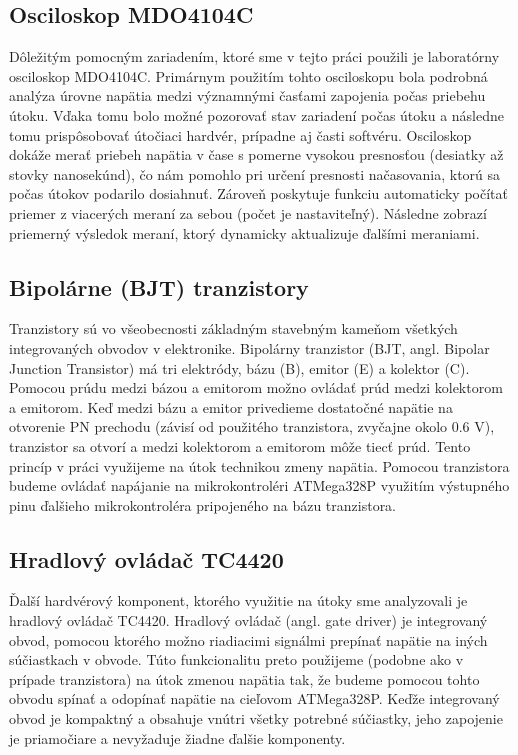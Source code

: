 \subsection{Osciloskop MDO4104C} \label{kap2:sek:osciloskop}
Dôležitým pomocným zariadením, ktoré sme v tejto práci použili je laboratórny osciloskop MDO4104C. Primárnym použitím tohto osciloskopu bola podrobná analýza úrovne napätia medzi významnými časťami zapojenia počas priebehu útoku. Vďaka tomu bolo možné pozorovať stav zariadení počas útoku a následne tomu prispôsobovať útočiaci hardvér, prípadne aj časti softvéru. Osciloskop dokáže merať priebeh napätia v čase s pomerne vysokou presnosťou (desiatky až stovky nanosekúnd), čo nám pomohlo pri určení presnosti načasovania, ktorú sa počas útokov podarilo dosiahnuť. Zároveň poskytuje funkciu automaticky počítať priemer z viacerých meraní za sebou (počet je nastaviteľný). Následne zobrazí priemerný výsledok meraní, ktorý dynamicky aktualizuje ďalšími meraniami.

\subsection{Bipolárne (BJT) tranzistory}
Tranzistory sú vo všeobecnosti základným stavebným kameňom všetkých integrovaných obvodov v elektronike. Bipolárny tranzistor (BJT, angl. Bipolar Junction Transistor) má tri elektródy, bázu (B), emitor (E) a kolektor (C). Pomocou prúdu medzi bázou a emitorom možno ovládať prúd medzi kolektorom a emitorom. Keď medzi bázu a emitor privedieme dostatočné napätie na otvorenie PN prechodu (závisí od použitého tranzistora, zvyčajne okolo 0.6 V), tranzistor sa otvorí a medzi kolektorom a emitorom môže tiecť prúd. Tento princíp v práci využijeme na útok technikou zmeny napätia. Pomocou tranzistora budeme ovládať napájanie na mikrokontroléri ATMega328P využitím výstupného pinu ďalšieho mikrokontroléra pripojeného na bázu tranzistora.

\subsection{Hradlový ovládač TC4420} \label{kap2:sek:hradlovyOvladac}
Ďalší hardvérový komponent, ktorého využitie na útoky sme analyzovali je hradlový ovládač TC4420. Hradlový ovládač (angl. gate driver) je integrovaný obvod, pomocou ktorého možno riadiacimi signálmi prepínať napätie na iných súčiastkach v obvode. Túto funkcionalitu preto použijeme (podobne ako v prípade tranzistora) na útok zmenou napätia tak, že budeme pomocou tohto obvodu spínať a odopínať napätie na cieľovom ATMega328P. Keďže integrovaný obvod je kompaktný a obsahuje vnútri všetky potrebné súčiastky, jeho zapojenie je priamočiare a nevyžaduje žiadne ďalšie komponenty.